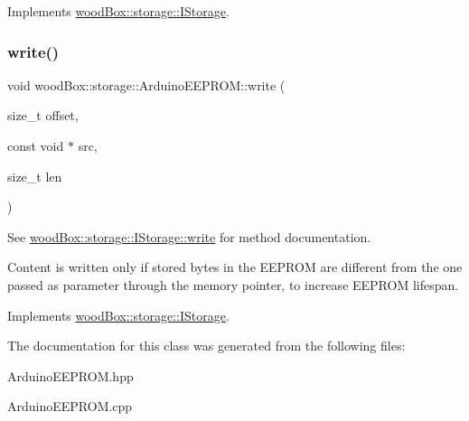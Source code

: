 Implements \mbox{\hyperlink{classwood_box_1_1storage_1_1_i_storage_a01bab924be0844e3866b27279caa506d}{wood\+Box\+::storage\+::\+I\+Storage}}.

\mbox{\label{classwood_box_1_1storage_1_1_arduino_e_e_p_r_o_m_af78d2077806af7e1aac65d6890915d77}} 
\subsubsection{\texorpdfstring{write()}{write()}}
{\footnotesize\ttfamily void wood\+Box\+::storage\+::\+Arduino\+E\+E\+P\+R\+O\+M\+::write (\begin{DoxyParamCaption}\item[{size\+\_\+t}]{offset,  }\item[{const void $\ast$}]{src,  }\item[{size\+\_\+t}]{len }\end{DoxyParamCaption})\hspace{0.3cm}{\ttfamily [virtual]}}

See \mbox{\hyperlink{classwood_box_1_1storage_1_1_i_storage_a5eb82c922e8a3147ddab510706be8e24}{wood\+Box\+::storage\+::\+I\+Storage\+::write}} for method documentation.

Content is written only if stored bytes in the E\+E\+P\+R\+OM are different from the one passed as parameter through the memory pointer, to increase E\+E\+P\+R\+OM lifespan. 

Implements \mbox{\hyperlink{classwood_box_1_1storage_1_1_i_storage_a5eb82c922e8a3147ddab510706be8e24}{wood\+Box\+::storage\+::\+I\+Storage}}.



The documentation for this class was generated from the following files\+:\begin{DoxyCompactItemize}
\item 
Arduino\+E\+E\+P\+R\+O\+M.\+hpp\item 
Arduino\+E\+E\+P\+R\+O\+M.\+cpp\end{DoxyCompactItemize}
